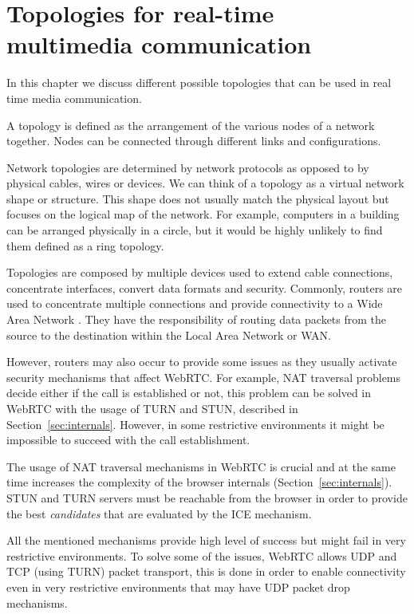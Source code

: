 \section{Topologies for real-time multimedia communication}
\label{sec:topologies}

\thispagestyle{empty}

In this chapter we discuss different possible topologies that can be used in real time media communication.

A topology is defined as the arrangement of the various nodes of a network together. Nodes can be connected through different links and configurations. 

Network topologies are determined by network protocols as opposed to by physical cables, wires or devices. We can think of a topology as a virtual network shape or structure. This shape does not usually match the physical layout but focuses on the logical map of the network. For example, computers in a building can be arranged physically in a circle, but it would be highly unlikely to find them defined as a ring topology.

Topologies are composed by multiple devices used to extend cable connections, concentrate interfaces, convert data formats and security. Commonly, routers are used to concentrate multiple connections and provide connectivity to a Wide Area Network . They have the responsibility of routing data packets from the source to the destination within the Local Area Network  or WAN.  

However, routers may also occur to provide some issues as they usually activate security mechanisms that affect WebRTC. For example, NAT traversal problems decide either if the call is established or not, this problem can be solved in WebRTC with the usage of TURN and STUN, described in Section~\ref{sec:internals}. However, in some restrictive environments it might be impossible to succeed with the call establishment. 

The usage of NAT traversal mechanisms in WebRTC is crucial and at the same time increases the complexity of the browser internals (Section~\ref{sec:internals}). STUN and TURN servers must be reachable from the browser in order to provide the best {\it candidates} that are evaluated by the ICE mechanism.

All the mentioned mechanisms provide high level of success but might fail in very restrictive environments. To solve some of the issues, WebRTC allows UDP and TCP (using TURN) packet transport, this is done in order to enable connectivity even in very restrictive environments that may have UDP packet drop mechanisms. 

